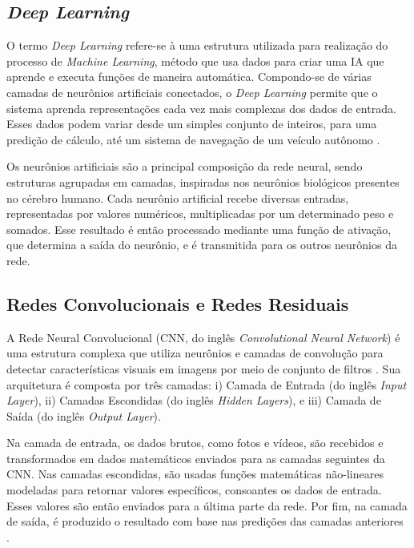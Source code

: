 
\subsection{\esp \textit{Deep Learning}} \label{deeplearning}


O termo \textit{Deep Learning} refere-se à uma estrutura utilizada para realização do processo de \textit{Machine Learning}, método que usa dados para criar uma IA que aprende e executa funções de maneira automática. Compondo-se de várias camadas de neurônios artificiais conectados, o \textit{Deep Learning} permite que o sistema aprenda representações cada vez mais complexas dos dados de entrada. Esses dados podem variar desde um simples conjunto de inteiros, para uma predição de cálculo, até um sistema de navegação de um veículo autônomo \cite{deeplearning}.

Os neurônios artificiais são a principal composição da rede neural, sendo estruturas agrupadas em camadas, inspiradas nos neurônios biológicos presentes no cérebro humano. Cada neurônio artificial recebe diversas entradas, representadas por valores numéricos, multiplicadas por um determinado peso e somados. Esse resultado é então processado mediante uma função de ativação, que determina a saída do neurônio, e é transmitida para os outros neurônios da rede.





\subsection{\esp Redes Convolucionais e Redes Residuais} \label{redesconvoleredesresidual}

A Rede Neural Convolucional (CNN, do inglês \textit{Convolutional Neural Network}) é uma estrutura complexa que utiliza neurônios e camadas de convolução para detectar características visuais em imagens por meio de conjunto de filtros \cite{cnn}. Sua arquitetura é composta por três camadas: i) Camada de Entrada (do inglês \textit{Input Layer}), ii) Camadas Escondidas (do inglês \textit{Hidden Layers}), e iii) Camada de Saída (do inglês \textit{Output Layer}).

Na camada de entrada, os dados brutos, como fotos e vídeos, são recebidos e transformados em dados matemáticos enviados para as camadas seguintes da CNN. Nas camadas escondidas, são usadas funções matemáticas não-lineares modeladas para retornar valores específicos, consoantes os dados de entrada. Esses valores são então enviados para a última parte da rede. Por fim, na camada de saída, é produzido o resultado com base nas predições das camadas anteriores \cite{medical}.

